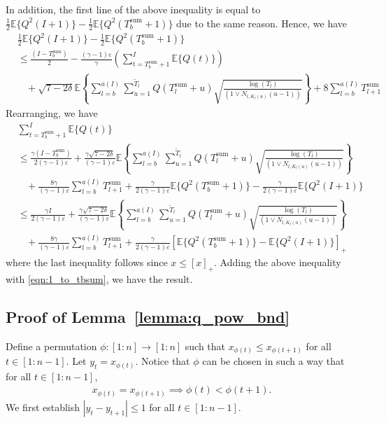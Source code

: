 \documentclass[12pt,draftcls, onecolumn]{IEEEtran}
\begin{document}
{In addition, the first line of the above inequality is equal to $\frac{1}{2}\mathbb{E}\{Q^2( I+1)\} - \frac{1}{2}\mathbb{E}\{Q^2(T^{\text{sum}}_b+1)\}$ due to the same reason. Hence, we have
\begin{align}
     &\frac{1}{2}\mathbb{E}\{Q^2( I+1)\} - \frac{1}{2}\mathbb{E}\{Q^2(T^{\text{sum}}_b+1)\}  \nonumber\\&\leq  \frac{( I-T^{\text{sum}}_b)}{2} - \frac{(\gamma -1)\varepsilon}{\gamma}\left( \sum_{t=T^{\text{sum}}_b+1}^{I} \mathbb{E}\{Q(t)\}\right)  \nonumber\\& \ \ \ \ + \sqrt{7-2\delta} \mathbb{E}\left\{\sum_{l=b}^{a( I)}\sum_{u=1}^{\tilde{T}_l} Q(T^{\text{sum}}_l+u)\sqrt{\frac{\log\left(T_l\right)}{(1 \vee N_{l,K_l(u)}(u-1))}}\right\}  + 8\sum_{l=b}^{a( I)}T^{\text{sum}}_{l+1} \nonumber
\end{align}
Rearranging, we have
\begin{align}
&\sum_{t=T^{\text{sum}}_b+1}^{I}\mathbb{E}\{Q(t)\} \nonumber\\&\leq \frac{\gamma (I-T^{\text{sum}}_b)}{2(\gamma-1)\varepsilon}+ \frac{\gamma\sqrt{7-2\delta}}{(\gamma-1)\varepsilon} \mathbb{E}\left\{\sum_{l=b}^{a( I)}\sum_{u=1}^{\tilde{T}_l} Q(T^{\text{sum}}_l+u)\sqrt{\frac{\log\left(T_l\right)}{(1 \vee N_{l,K_l(u)}(u-1))}}\right\} \nonumber\\&\ \ \ \ + \frac{8\gamma}{(\gamma-1)\varepsilon}\sum_{l=b}^{a( I)}T^{\text{sum}}_{l+1}  + \frac{\gamma}{2(\gamma-1)\varepsilon}\mathbb{E}\{Q^2(T^{\text{sum}}_b+1)\}-\frac{\gamma}{2(\gamma-1)\varepsilon}\mathbb{E}\{Q^2( I+1)\}\nonumber\\& \leq \frac{\gamma I}{2(\gamma-1)\varepsilon}+  \frac{\gamma\sqrt{7-2\delta}}{(\gamma-1)\varepsilon} \mathbb{E}\left\{\sum_{l=b}^{a( I)}\sum_{u=1}^{\tilde{T}_l} Q(T^{\text{sum}}_l+u)\sqrt{\frac{\log\left(T_l\right)}{(1 \vee N_{l,K_l(u)}(u-1))}}\right\} \nonumber\\&\ \ \ \ + \frac{8\gamma}{(\gamma-1)\varepsilon}\sum_{l=b}^{a( I)}T^{\text{sum}}_{l+1}   + \frac{\gamma}{2(\gamma-1)\varepsilon}\left[\mathbb{E}\{Q^2(T^{\text{sum}}_b+1)\}-\mathbb{E}\{Q^2( I+1)\}\right]_+
\end{align}
where the last inequality follows since $x \leq [x]_+$.
Adding the above inequality with \eqref{eqn:1_to_tbsum}, we have the result.
\subsection{Proof of Lemma~\ref{lemma:q_pow_bnd}}\label{app:q_pow_bnd}
Define a permutation $\phi: [1:n] \to [1:n]$ such that $x_{\phi(t)} \leq x_{\phi(t+1)}$ for all $t \in [1:n-1]$. Let $y_t = x_{\phi(t)}$. Notice that $\phi$ can be chosen in such a way that for all $t \in [1:n-1]$,
\begin{align}\label{eqn:cond}
    x_{\phi(t)} = x_{\phi(t+1)} \implies \phi(t) < \phi(t+1).
\end{align}
We first establish $|y_t - y_{t+1}| \leq 1$ for all $t \in [1:n-1]$. 

}
\end{document}
